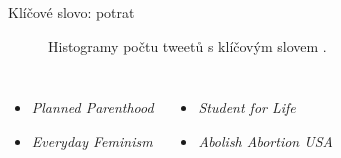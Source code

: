 \documentclass[notheorems,12pt]{beamer}
\begin{document}
\begin{frame}{Klíčové slovo: potrat}
    \begin{figure}
        \centering
        \vspace{-0.7cm}
        \caption*{Histogramy počtu tweetů s klíčovým slovem \textit{}.}
    \end{figure}
    \begin{columns}
    \column{6cm}
    	\begin{itemize}
    		\item \textit{Planned Parenthood}
    		\item \textit{Everyday Feminism}
    	\end{itemize}
    \column{6cm}
    	\begin{itemize}
    		\item \textit{Student for Life}
    		\item \textit{Abolish Abortion USA}
    	\end{itemize}
    \end{columns}
\end{frame}
\end{document}
